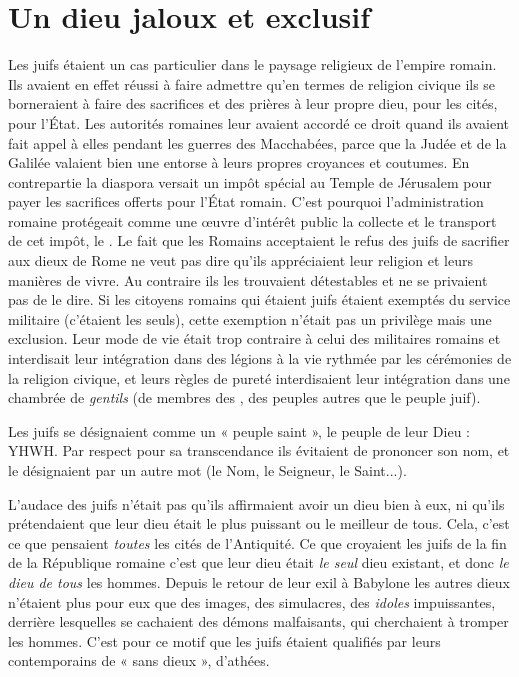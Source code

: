 \section{Un dieu jaloux et exclusif}

 Les juifs étaient un cas particulier dans le paysage religieux de l'empire romain. Ils avaient en effet réussi à faire admettre qu'en termes de religion civique ils se borneraient à faire des sacrifices et des prières à leur propre dieu, pour les cités, pour l'État. Les autorités romaines leur avaient accordé ce droit quand ils avaient fait appel à elles pendant les guerres des Macchabées, parce que la Judée et de la Galilée valaient bien une entorse à leurs propres croyances et coutumes. En contrepartie la diaspora versait un impôt spécial au Temple de Jérusalem pour payer les sacrifices offerts pour l'État romain. C'est pourquoi l'administration romaine protégeait comme une œuvre d'intérêt public la collecte et le transport de cet impôt, le . Le fait que les Romains acceptaient le refus des juifs de sacrifier aux dieux de Rome ne veut pas dire qu'ils appréciaient leur religion et leurs manières de vivre. Au contraire ils les trouvaient détestables et ne se privaient pas de le dire. Si les citoyens romains qui étaient juifs étaient exemptés du service militaire (c'étaient les seuls), cette exemption n'était pas un privilège mais une exclusion. Leur mode de vie était trop contraire à celui des militaires romains et interdisait leur intégration dans des légions à la vie rythmée par les cérémonies de la religion civique, et leurs règles de pureté interdisaient leur intégration dans une chambrée de \emph{gentils} (de membres des , des peuples autres que le peuple juif). 

 Les juifs se désignaient comme un « peuple saint », le peuple de leur Dieu : YHWH. Par respect pour sa transcendance ils évitaient de prononcer son nom, et le désignaient par un autre mot (le Nom, le Seigneur, le Saint...). 

 L'audace des juifs n'était pas qu'ils affirmaient avoir un dieu bien à eux, ni qu'ils prétendaient que leur dieu était le plus puissant ou le meilleur de tous. Cela, c'est ce que pensaient \emph{toutes} les cités de l'Antiquité. Ce que croyaient les juifs de la fin de la République romaine c'est que leur dieu était \emph{le seul} dieu existant, et donc \emph{le dieu de tous} les hommes. Depuis le retour de leur exil à Babylone les autres dieux n'étaient plus pour eux que des images, des simulacres, des \emph{idoles} impuissantes, derrière lesquelles se cachaient des démons malfaisants, qui cherchaient à tromper les hommes. C'est pour ce motif que les juifs étaient qualifiés par leurs contemporains de « {sans dieux} », d'athées. 


